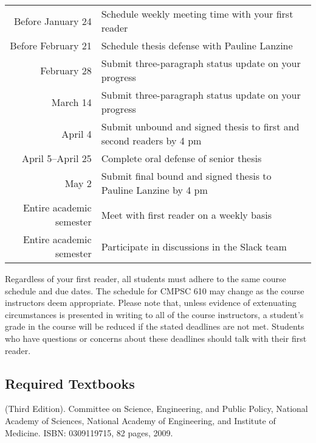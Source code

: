\begin{center}
\begin{tabular}{r|l}
\hline

Before January 24  & Schedule weekly meeting time with your first reader \\
Before February 21 & Schedule thesis defense with Pauline Lanzine \\
February 28        & Submit three-paragraph status update on your progress \\
March 14           & Submit three-paragraph status update on your progress \\
April 4            & Submit unbound and signed thesis to first and second readers by 4 pm \\
April 5--April 25  & Complete oral defense of senior thesis \\
May 2              & Submit final bound and signed thesis to Pauline Lanzine by 4 pm\\

\hline
Entire academic semester & Meet with first reader on a weekly basis \\
Entire academic semester & Participate in discussions in the Slack team \\
\hline
\end{tabular}
\end{center}

\noindent Regardless of your first reader, all students must adhere to the same course schedule and due dates. The
schedule for CMPSC 610 may change as the course instructors deem appropriate. Please note that, unless evidence of
extenuating circumstances is presented in writing to all of the course instructors, a student's grade in the course will
be reduced if the stated deadlines are not met. Students who have questions or concerns about these deadlines should
talk with their first reader.

\vspace{-.15in}
\subsection*{Required Textbooks}
\vspace{-.05in}

 (Third Edition). Committee on Science,
Engineering, and Public Policy, National Academy of Sciences, National Academy of Engineering, and Institute of
Medicine. ISBN: 0309119715, 82 pages, 2009.

